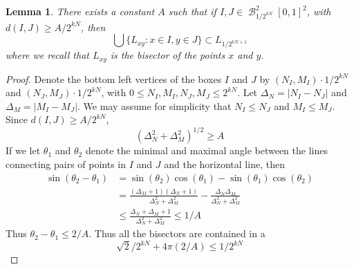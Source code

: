 \documentclass[dvipsnames,letterpaper,12pt]{article}
\numberwithin{equation}{section}
\theoremstyle{plain}
\newtheorem{lemma}{Lemma}
\DeclareMathOperator{\B}{\mathcal{B}}
\begin{document}
\begin{lemma}
	There exists a constant $A$ such that if $I, J \in \B^2_{1/2^{kN}}[0,1]^2$, with $d(I,J) \geq A/2^{kN}$, then
	\[ \bigcup \{ L_{xy}: x \in I, y \in J \} \subset L_{1/2^{kN+1}} \]
	where we recall that $L_{xy}$ is the bisector of the points $x$ and $y$.
\end{lemma}
\begin{proof}
	Denote the bottom left vertices of the boxes $I$ and $J$ by $(N_I,M_I) \cdot 1/2^{kN}$ and $(N_J,M_J) \cdot 1/2^{kN}$, with $0 \leq N_I,M_I,N_J,M_J \leq 2^{kN}$. Let $\Delta_N = |N_I - N_J|$ and $\Delta_M = |M_I - M_J|$. We may assume for simplicity that $N_I \leq N_J$ and $M_I \leq M_J$. Since $d(I,J) \geq A/2^{kN}$,
	\[ (\Delta_N^2 + \Delta_M^2)^{1/2} \geq A \]
	If we let $\theta_1$ and $\theta_2$ denote the minimal and maximal angle between the lines connecting pairs of points in $I$ and $J$ and the horizontal line, then
	\begin{align*}
		\sin(\theta_2 - \theta_1) &= \sin(\theta_2) \cos(\theta_1) - \sin(\theta_1) \cos(\theta_2)\\
		&= \frac{(\Delta_M + 1)(\Delta_N + 1)}{\Delta_N^2 + \Delta_M^2} - \frac{\Delta_N \Delta_M}{\Delta_N^2 + \Delta_M^2}\\
		&\leq \frac{\Delta_N + \Delta_M + 1}{\Delta_N^2 + \Delta_M^2} \leq 1/A
	\end{align*}
	Thus $\theta_2 - \theta_1 \leq 2/A$. Thus all the bisectors are contained in a
	\[ \sqrt{2}/2^{kN} + 4\pi(2/A) \leq 1/2^{kN} \]
\end{proof}
\end{document}
